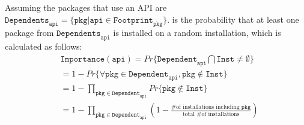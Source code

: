 \noindent
Assuming the packages that use an API are  
$\mathtt{Dependents}_\mathtt{api} = \{\mathtt{pkg}|\mathtt{api} \in \mathtt{Footprint}_\mathtt{pkg}\}$.
\Usagemetric{} is the probability that at least one package
from $\mathtt{Dependents}_\mathtt{api}$ is installed on a random installation, which is calculated as follows:
\begin{align*}
&\mathtt{Importance}(\mathtt{api}) = Pr\{\mathtt{Dependent}_\mathtt{api} \bigcap \mathtt{Inst} \neq \emptyset\} \\
&= 1 - Pr\{\forall \mathtt{pkg} \in \mathtt{Dependent}_\mathtt{api}, \mathtt{pkg} \notin \mathtt{Inst}\} \\
&= 1 - \prod_{\mathtt{pkg} \in \mathtt{Dependent}_\mathtt{api}} Pr\{\mathtt{pkg} \notin \mathtt{Inst}\} \\
&= 1 - \prod_{\mathtt{pkg} \in \mathtt{Dependent}_\mathtt{api}} (1 - \frac{\text{\# of installations including $\mathtt{pkg}$}}{\text{total \# of installations}})
\end{align*}

\section{\CompatMetric{}}
\label{sec:defs:compatmetric}





\begin{comment}
We defined {\bf platform compatibility} as "{\em the probability of porting any installation of an OS distribution onto the target OS without any effort}".
The definition of an {\em installation} is a combination of application setup on a standalone OS instance.
An Installation can exist on physical machines,
or any machines of generalized sense such as a virtual machines, containers or subsystems.
In our model, installations represent customers of the OS, who are considered equal when providing any services.
\end{comment}

